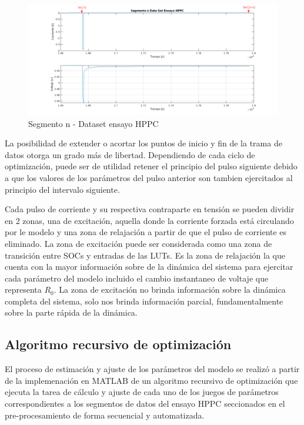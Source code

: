 \documentclass[10pt, a4paper]{report}
\begin{document}
\begin{figure}[h!]
    \centering
        \includegraphics[width=1\textwidth]{data_seg_hppc.png}
        \caption{Segmento n - Dataset ensayo \acrshort{HPPC}}
        \label{fig:data_seg_hppc}
\end{figure}
\FloatBarrier

La posibilidad de extender o acortar los puntos de inicio y fin de la trama de
datos otorga un grado más de libertad. Dependiendo de cada ciclo de
optimización, puede ser de utilidad retener el principio del pulso siguiente
debido a que los valores de los parámetros del pulso anterior son tambien
ejercitados al principio del intervalo siguiente. 

Cada pulso de corriente y su respectiva contraparte en tensión se pueden dividir
en 2 zonas, una de excitación, aquella donde la corriente forzada está
circulando por le modelo y una zona de relajación a partir de que el pulso de
corriente es eliminado. La zona de excitación puede ser considerada como una
zona de transición entre \acrshort{SOC}s y entradas de las \acrshort{LUT}s.
Es la zona de relajación la que cuenta con la mayor información sobre de la
dinámica del sistema para ejercitar cada parámetro del modelo incluido el cambio
instantaneo de voltaje que representa $R_{0}$. La zona de excitación no 
brinda información sobre la dinámica completa del sistema, solo nos
brinda información parcial, fundamentalmente sobre la parte rápida de la
dinámica. 

\subsection{Algoritmo recursivo de optimizaci\'on}

El proceso de estimación y ajuste de los parámetros del modelo se realizó a
partir de la implemenación en MATLAB de un algoritmo recursivo de optimización
que ejecuta la tarea de cálculo y ajuste de cada uno de los juegos de parámetros
correspondientes a los segmentos de datos del ensayo \acrshort{HPPC} seccionados
en el pre-procesamiento de forma secuencial y automatizada.
\end{document}
